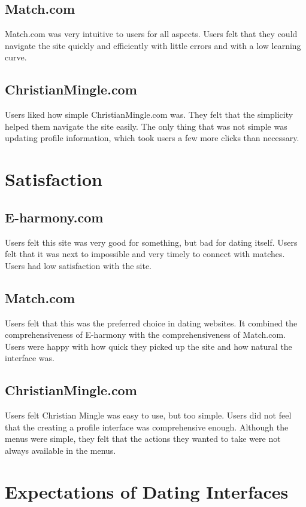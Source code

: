 \documentclass{article}
\begin{document}
\subsection{Match.com}
Match.com was very intuitive to users for all aspects. Users felt that they could navigate the site quickly and efficiently with little errors and with a low learning curve.

\subsection{ChristianMingle.com}
Users liked how simple ChristianMingle.com was. They felt that the simplicity helped them navigate the site easily. The only thing that was not simple was updating profile information, which took users a few more clicks than necessary.


\section{Satisfaction}
\subsection{E-harmony.com}
Users felt this site was very good for something, but bad for dating itself. Users felt that it was next to impossible and very timely to connect with matches. Users had low satisfaction with the site.


\subsection{Match.com}
	Users felt that this was the preferred choice in dating websites. It combined the comprehensiveness of E-harmony with the comprehensiveness of Match.com. Users were happy with how quick they picked up the site and how natural the interface was.

\subsection{ChristianMingle.com}
Users felt Christian Mingle was easy to use, but too simple. Users did not feel that the creating a profile interface was comprehensive enough. Although the menus were simple, they felt that the actions they wanted to take were not always available in the menus.

\section{Expectations of Dating Interfaces}
\end{document}
